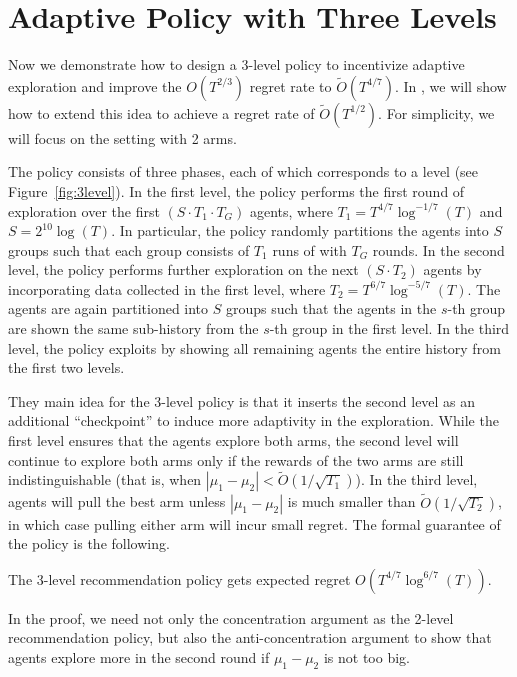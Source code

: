
\section{Adaptive Policy with Three Levels}
\label{sec:3level}
Now we demonstrate how to design a 3-level policy to incentivize
adaptive exploration and improve the $O(T^{2/3})$ regret rate to
$\tilde O(T^{4/7})$. In , we will show how to extend
this idea to achieve a regret rate of $\tilde O(T^{1/2})$. For
simplicity, we will focus on the setting with 2 arms.


The policy consists of three phases, each of which corresponds to a
level (see Figure~\ref{fig:3level}).  In the first level, the policy
performs the first round of exploration over the first
$(S\cdot T_1\cdot T_G)$ agents, where $T_1 = T^{4/7}\log^{-1/7}(T)$
and $S = 2^{10}\log(T)$. In particular, the policy randomly partitions
the agents into $S$ groups such that each group consists of $T_1$ runs
of \ALGG with $T_G$ rounds. In the second level, the policy performs
further exploration on the next $(S\cdot T_2)$ agents by incorporating
data collected in the first level, where
$T_2 = T^{6/7}\log^{-5/7}(T)$. The agents are again partitioned into
$S$ groups such that the agents in the $s$-th group are shown the same
sub-history from the $s$-th group in the first level. In the third
level, the policy exploits by showing all remaining agents the entire
history from the first two levels.


They main idea for the 3-level policy is that it inserts the second
level as an additional ``checkpoint'' to induce more adaptivity in the
exploration. While the first level ensures that the agents explore
both arms, the second level will continue to explore both arms only if
the rewards of the two arms are still indistinguishable (that is, when
$|\mu_1 - \mu_2| < \tilde{O}(1/\sqrt{T_1})$). In the third level,
agents will pull the best arm unless $|\mu_1-\mu_2|$ is much smaller
than $\tilde{O}(1/\sqrt{T_2})$, in which case pulling either arm will
incur small regret. The formal guarantee of the policy is the
following.

\begin{theorem}
\label{thm:3level}
The 3-level recommendation policy gets expected regret $O(T^{4/7} \log^{6/7}(T))$. 
\end{theorem}




\iffalse
In the proof, we need not only the concentration argument as the
2-level recommendation policy, but also the anti-concentration
argument to show that agents explore more in the second round if
$\mu_1-\mu_2$ is not too big.

